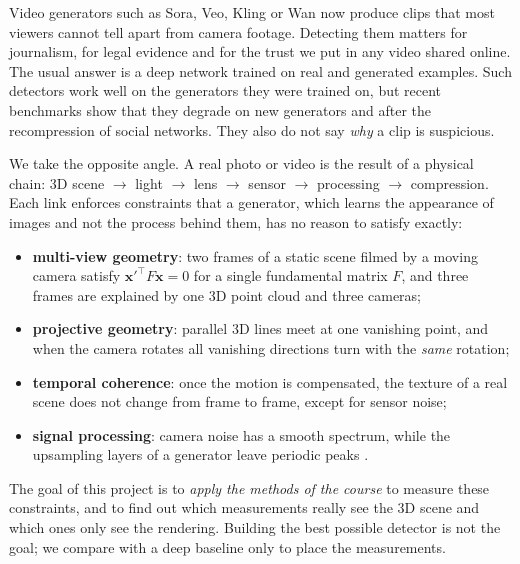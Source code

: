 \documentclass[11pt,a4paper]{article}
\newcommand{\x}{\mathbf{x}}
\begin{document}
Video generators such as Sora, Veo, Kling or Wan now produce clips that most viewers cannot
tell apart from camera footage. Detecting them matters for journalism, for legal evidence and
for the trust we put in any video shared online. The usual answer is a deep network trained
on real and generated examples. Such detectors work well on the generators they were trained
on, but recent benchmarks \cite{genvidbench,aigvdbench} show that they degrade on new
generators and after the recompression of social networks. They also do not say \emph{why}
a clip is suspicious.

We take the opposite angle. A real photo or video is the result of a physical chain:
3D scene $\rightarrow$ light $\rightarrow$ lens $\rightarrow$ sensor $\rightarrow$
processing $\rightarrow$ compression. Each link enforces constraints that a generator,
which learns the appearance of images and not the process behind them, has no reason to
satisfy exactly:
\begin{itemize}
  \item \textbf{multi-view geometry}: two frames of a static scene filmed by a moving camera
        satisfy $\x'^{\top}F\x=0$ for a single fundamental matrix $F$, and three frames are
        explained by one 3D point cloud and three cameras;
  \item \textbf{projective geometry}: parallel 3D lines meet at one vanishing point, and when
        the camera rotates all vanishing directions turn with the \emph{same} rotation;
  \item \textbf{temporal coherence}: once the motion is compensated, the texture of a real
        scene does not change from frame to frame, except for sensor noise;
  \item \textbf{signal processing}: camera noise has a smooth spectrum, while the upsampling
        layers of a generator leave periodic peaks \cite{durall2020,zhang2019}.
\end{itemize}

The goal of this project is to \emph{apply the methods of the course} to measure these
constraints, and to find out which measurements really see the 3D scene and which ones only
see the rendering. Building the best possible detector is not the goal; we compare with a
deep baseline only to place the measurements.
\end{document}
